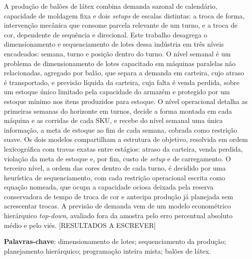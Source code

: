 \documentclass[
    12pt,
    openright,
    oneside,
    a4paper,
    fleqn,
    chapter=TITLE,
    section=TITLE,
    english,
    brazil
]{abntex2}
\begin{document}
\setlength{\absparsep}{18pt}
\begin{resumo}
A produção de balões de látex combina demanda sazonal de calendário, capacidade de moldagem fixa e dois \textit{setups} de escalas distintas: a troca de forma, intervenção mecânica que consome parcela relevante de um turno, e a troca de cor, dependente de sequência e direcional. Este trabalho desagrega o dimensionamento e sequenciamento de lotes dessa indústria em três níveis encadeados: semana, turno e posição dentro do turno. O nível semanal é um problema de dimensionamento de lotes capacitado em máquinas paralelas não relacionadas, agregado por balão, que separa a demanda em carteira, cujo atraso é transportado, e previsão líquida da carteira, cuja falta é venda perdida, sobre um estoque único limitado pela capacidade do armazém e protegido por um estoque mínimo nos itens produzidos para estoque. O nível operacional detalha as primeiras semanas do horizonte em turnos, decide a forma montada em cada máquina e as corridas de cada SKU, e recebe do nível semanal uma única informação, a meta de estoque ao fim de cada semana, cobrada como restrição suave. Os dois modelos compartilham a estrutura de objetivo, resolvida em ordem lexicográfica com travas exatas entre estágios: atraso da carteira, venda perdida, violação da meta de estoque e, por fim, custo de \textit{setup} e de carregamento. O terceiro nível, a ordem das cores dentro de cada turno, é decidido por uma heurística de sequenciamento, com cada restrição operacional escrita como equação nomeada, que ocupa a capacidade ociosa deixada pela reserva conservadora de tempo de troca de cor e antecipa produção já planejada sem acrescentar trocas. A previsão de demanda vem de um modelo econométrico hierárquico \textit{top-down}, avaliado fora da amostra pelo erro percentual absoluto médio e pelo viés. [RESULTADOS A ESCREVER]

\textbf{Palavras-chave}: dimensionamento de lotes; sequenciamento da produção; planejamento hierárquico; programação inteira mista; balões de látex.
\end{resumo}
\end{document}
